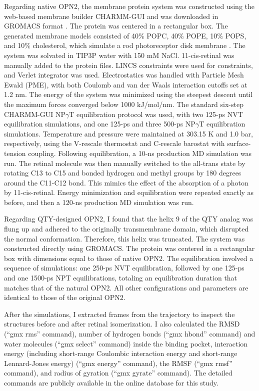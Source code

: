 \documentclass[fleqn, 10pt]{manuscript}
\begin{document}
Regarding native OPN2, the membrane protein system was constructed using the web-based membrane builder CHARMM-GUI and was downloaded in GROMACS format \citep{Jo_2008, Wu_2014, Lee_2016}. The protein was centered in a rectangular box. The generated membrane models consisted of 40\% POPC, 40\% POPE, 10\% POPS, and 10\% cholesterol, which simulate a rod photoreceptor disk membrane \citep{Albert_2005}. The system was solvated in TIP3P water with 150 mM NaCl. 11-cis-retinal was manually added to the protein files. LINCS constraints were used for constraints, and Verlet integrator was used. Electrostatics was handled with Particle Mesh Ewald (PME), with both Coulomb and van der Waals interaction cutoffs set at 1.2 nm. The energy of the system was minimized using the steepest descent until the maximum forces converged below 1000 kJ/mol/nm. The standard six-step CHARMM-GUI NP$\gamma$T equilibration protocol \citep{Jo_2008} was used, with two 125-ps NVT equilibration simulations, and one 125-ps and three 500-ps NP$\gamma$T equilibration simulations. Temperature and pressure were maintained at 303.15 K and 1.0 bar, respectively, using the V-rescale thermostat and C-rescale barostat with surface-tension coupling. Following equilibration, a 10-ns production MD simulation was run. The retinal molecule was then manually switched to the all-trans state by rotating C13 to C15 and bonded hydrogen and methyl groups by 180 degrees around the C11-C12 bond. This mimics the effect of the absorption of a photon by 11-cis-retinal. Energy minimization and equilibration were repeated exactly as before, and then a 120-ns production MD simulation was run. 

Regarding QTY-designed OPN2, I found that the helix 9 of the QTY analog was flung up and adhered to the originally transmembrane domain, which disrupted the normal conformation. Therefore, this helix was truncated. The system was constructed directly using GROMACS. The protein was centered in a rectangular box with dimensions equal to those of native OPN2. The equilibration involved a sequence of simulations: one 250-ps NVT equilibration, followed by one 125-ps and one 1500-ps NPT equilibrations, totaling an equilibration duration that matches that of the natural OPN2. All other configurations and parameters are identical to those of the original OPN2.

After the simulations, I extracted frames from the trajectory to inspect the structures before and after retinal isomerization. I also calculated the RMSD (``gmx rms'' command), number of hydrogen bonds (``gmx hbond'' command) and water molecules (``gmx select'' command) inside the binding pocket, interaction energy (including short-range Coulombic interaction energy and short-range Lennard-Jones energy) (``gmx energy'' command), the RMSF (``gmx rmsf'' command), and radius of gyration (``gmx gyrate'' command). The detailed commands are publicly available in the online database for this study. 
\end{document}
